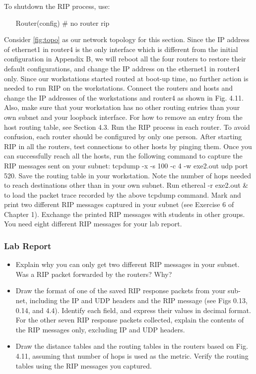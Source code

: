 \documentclass[10pt,a4paper]{article}
\numberwithin{equation}{section}
\numberwithin{figure}{section}
\numberwithin{table}{section}
\begin{document}
 To shutdown the RIP process, use:
 \begin{itemize}
	\setlength{\itemindent}{60pt}
	\item [Router(config) \#] no router rip
\end{itemize}

Consider \ref{fig:topo} as our network topology for this section. Since the IP
address of ethernet1 in router4 is the only interface which is different from the initial configuration in Appendix B, we will reboot all the four routers to restore their default configurations, and change the IP address on the ethernet1 in router4 only. Since our workstations started routed at boot-up time, no further action is needed to run RIP on the workstations.
Connect the routers and hosts and change the IP addresses of the workstations and router4 as shown in Fig. 4.11. Also, make sure that your workstation has no other routing entries than your own subnet and your loopback interface. For how to remove an entry from the host routing table, see Section 4.3.
Run the RIP process in each router. To avoid confusion, each router should be configured by only one person.
After starting RIP in all the routers, test connections to other hosts by pinging them. Once you can successfully reach all the hosts, run the following command to capture the RIP messages sent on your subnet:
tcpdump -x -s 100 -c 4 -w exe2.out udp port 520.
Save the routing table in your workstation. Note the number of hops needed to reach
destinations other than in your own subnet.
Run ethereal -r exe2.out \& to load the packet trace recorded by the above tcpdump command. Mark and print two different RIP messages captured in your subnet (see Exercise 6 of Chapter 1). Exchange the printed RIP messages with students in other groups. You need eight different RIP messages for your lab report.

\subsubsection*{Lab Report}
\begin{itemize}
	\setlength{\itemindent}{0pt}
	\item Explain why you can only get two different RIP messages in your subnet. Was a RIP packet forwarded by the routers? Why?
	\item Draw the format of one of the saved RIP response packets from your sub- net, including the IP and UDP headers and the RIP message (see Figs 0.13, 0.14, and 4.4). Identify each field, and express their values in decimal format. \\
	For the other seven RIP response packets collected, explain the contents of
the RIP messages only, excluding IP and UDP headers.
	\item Draw the distance tables and the routing tables in the routers based on Fig. 4.11, assuming that number of hops is used as the metric. Verify the routing tables using the RIP messages you captured.
\end{itemize}
\end{document}
